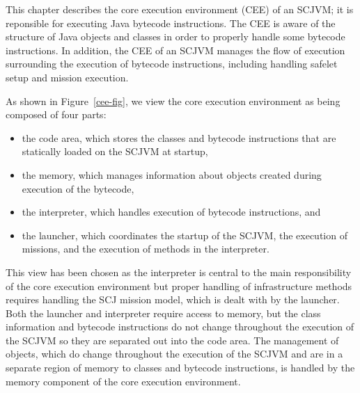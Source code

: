 \documentclass[a4paper,10pt]{report}
\begin{document}
This chapter describes the core execution environment (CEE) of an
SCJVM; it is reponsible for executing Java bytecode instructions.
The CEE is aware of the structure of Java objects
and classes in order to properly handle some bytecode instructions.
In addition, the CEE of an SCJVM manages the flow of execution surrounding the
execution of bytecode instructions, including handling safelet setup
and mission execution.

As shown in Figure~\ref{cee-fig}, we view the core execution
environment as being composed of four parts:
\begin{itemize}
\item the code area, which stores the classes and bytecode
  instructions that are statically loaded on the SCJVM at startup,
\item the memory, which manages information about objects created
  during execution of the bytecode,
\item the interpreter, which handles execution of bytecode
  instructions, and
\item the launcher, which coordinates the startup of the SCJVM, the
  execution of missions, and the execution of methods in the
  interpreter.
\end{itemize}
This view has been chosen as the interpreter is central to the main
responsibility of the core execution environment but proper handling
of infrastructure methods requires handling the SCJ mission model,
which is dealt with by the launcher.
Both the launcher and interpreter require access to memory, but the
class information and bytecode instructions do not change throughout
the execution of the SCJVM so they are separated out into the code
area.
The management of objects, which do change throughout the execution of
the SCJVM and are in a separate region of memory to classes and
bytecode instructions, is handled by the memory component of the core
execution environment.
\end{document}

